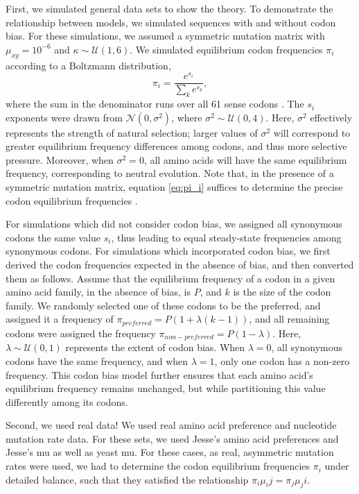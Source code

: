\documentclass[11pt]{article}
\begin{document}
First, we simulated general data sets to show the theory.
To demonstrate the relationship between models, we simulated sequences with and without codon bias. For these simulations, we assumed a symmetric mutation matrix with $\mu_{xy} = 10^{-6}$ and $\kappa \sim \mathcal{U} (1,6)$. We simulated equilibrium codon frequencies $\pi_i$ according to a Boltzmann distribution, 
 \begin{equation}\label{eq:pi_i}
 \pi_i=\frac{e^{s_i}}{\sum_k e^{s_k}} ,
\end{equation} where the sum in the denominator runs over all 61 sense codons \cite{SellaHirsh2005}. The $s_i$ exponents were drawn from  $\mathcal{N}(0,\sigma^2)$, where $\sigma^2 \sim \mathcal{U}(0,4)$. Here, $\sigma^2$ effectively represents the strength of natural selection; larger values of $\sigma^2$ will correspond to greater equilibrium frequency differences among codons, and thus more selective pressure. Moreover, when $\sigma^2 = 0$, all amino acids will have the same equilibrium frequency, corresponding to neutral evolution. Note that, in the presence of a symmetric mutation matrix, equation \eqref{eq:pi_i} suffices to determine the precise codon equilibrium frequencies \cite{SellaHirsh2005}.

For simulations which did not consider codon bias, we assigned all synonymous codons the same value $s_i$, thus leading to equal steady-state frequencies among synonymous codons. For simulations which incorporated codon bias, we first derived the codon frequencies expected in the absence of bias, and then converted them as follows. Assume that the equilibrium frequency of a codon in a given amino acid family, in the absence of bias, is $P$, and $k$ is the size of the codon family. We randomly selected one of these codons to be the preferred, and assigned it a frequency of $\pi_{preferred} = P(1 + \lambda(k-1))$, and all remaining codons were assigned the frequency $\pi_{non-preferred} = P(1 - \lambda)$. Here, $\lambda \sim \mathcal{U}(0,1)$ represents the extent of codon bias. When $\lambda = 0$, all synonymous codons have the same frequency, and when $\lambda = 1$, only one codon has a non-zero frequency. This codon bias model further ensures that each amino acid's equilibrium frequency remains unchanged, but while partitioning this value differently among its codons.


Second, we used real data! We used real amino acid preference and nucleotide mutation rate data. For these sets, we used Jesse's amino acid preferences and Jesse's mu as well as yeast mu. For these cases, as real, asymmetric mutation rates were used, we had to determine the codon equilibrium frequencies $\pi_i$ under detailed balance, such that they satisfied the relationship $\pi_i\mu_ij = \pi_j\mu_ji$. 
\end{document}
